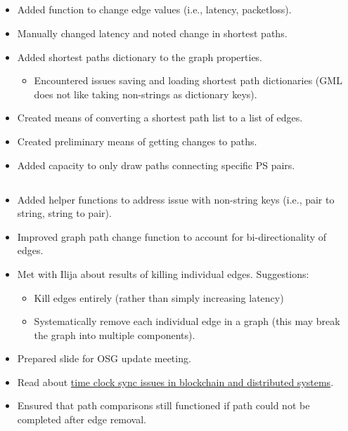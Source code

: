 \documentclass{weeklyreport}
\begin{document}
\subsection*{}

\begin{itemize}
    \item Added function to change edge values (i.e., latency, packetloss).
    \item Manually changed latency and noted change in shortest paths.
    \item Added shortest paths dictionary to the graph properties.
    \begin{itemize}
    	\item Encountered issues saving and loading shortest path dictionaries (GML does not like taking non-strings as dictionary keys).
    \end{itemize}
    \item Created means of converting a shortest path list to a list of edges.
    \item Created preliminary means of getting changes to paths.
    \item Added capacity to only draw paths connecting specific PS pairs.
\end{itemize}


\subsection*{}

\begin{itemize}
    \item Added helper functions to address issue with non-string keys (i.e., pair to string, string to pair).
    \item Improved graph path change function to account for bi-directionality of edges.
    \item Met with Ilija about results of killing individual edges. Suggestions:
    \begin{itemize}
    	\item Kill edges entirely (rather than simply increasing latency)
    	\item Systematically remove each individual edge in a graph (this may break the graph into multiple components).
    \end{itemize}
    \item Prepared slide for OSG update meeting.
    \item Read about \href{https://multicoin.capital/2019/07/16/the-separation-of-time-and-state/}{time clock sync issues in blockchain and distributed systems}.
    \item Ensured that path comparisons still functioned if path could not be completed after edge removal.
\end{itemize}
\end{document}
